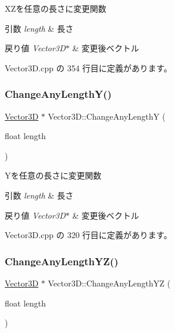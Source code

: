 X\+Zを任意の長さに変更関数 


\begin{DoxyParams}{引数}
{\em length} & 長さ \\
\hline
\end{DoxyParams}

\begin{DoxyRetVals}{戻り値}
{\em Vector3\+D$\ast$} & 変更後ベクトル \\
\hline
\end{DoxyRetVals}


 Vector3\+D.\+cpp の 354 行目に定義があります。

\mbox{\label{class_vector3_d_a2444fe3402cb2b869bb17ec15559f036}} 
\subsubsection{\texorpdfstring{Change\+Any\+Length\+Y()}{ChangeAnyLengthY()}}
{\footnotesize\ttfamily \mbox{\hyperlink{class_vector3_d}{Vector3D}} $\ast$ Vector3\+D\+::\+Change\+Any\+LengthY (\begin{DoxyParamCaption}\item[{float}]{length }\end{DoxyParamCaption})}



Yを任意の長さに変更関数 


\begin{DoxyParams}{引数}
{\em length} & 長さ \\
\hline
\end{DoxyParams}

\begin{DoxyRetVals}{戻り値}
{\em Vector3\+D$\ast$} & 変更後ベクトル \\
\hline
\end{DoxyRetVals}


 Vector3\+D.\+cpp の 320 行目に定義があります。

\mbox{\label{class_vector3_d_aa008639776dce3f6aed3f88fb2d67ded}} 
\subsubsection{\texorpdfstring{Change\+Any\+Length\+Y\+Z()}{ChangeAnyLengthYZ()}}
{\footnotesize\ttfamily \mbox{\hyperlink{class_vector3_d}{Vector3D}} $\ast$ Vector3\+D\+::\+Change\+Any\+Length\+YZ (\begin{DoxyParamCaption}\item[{float}]{length }\end{DoxyParamCaption})}



